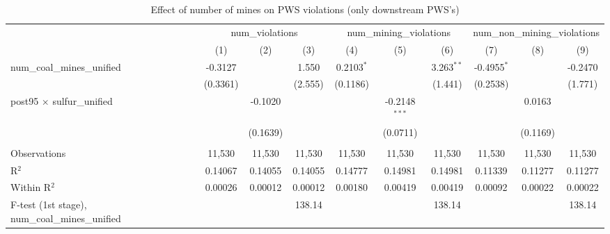 
\begin{table}[htbp]
   \caption{\label{olsrf2sls_nummine_count_vio_1985to2005dwnstrm_coalunified} Effect of number of mines on PWS violations (only downstream PWS's)}
   \bigskip
   \centering
   \begin{adjustbox}{width = \textwidth, center}
      \begin{tabular}{lccccccccc}
         \toprule
          & \multicolumn{3}{c}{num\_violations} & \multicolumn{3}{c}{num\_mining\_violations} & \multicolumn{3}{c}{num\_non\_mining\_violations}\\
                                                          & (1)           & (2)           & (3)           & (4)           & (5)             & (6)           & (7)           & (8)           & (9)\\  
         \midrule 
         num\_coal\_mines\_unified                        & -0.3127       &               & 1.550         & 0.2103$^{*}$  &                 & 3.263$^{**}$  & -0.4955$^{*}$ &               & -0.2470\\   
                                                          & (0.3361)      &               & (2.555)       & (0.1186)      &                 & (1.441)       & (0.2538)      &               & (1.771)\\   
         post95 $\times$ sulfur\_unified                  &               & -0.1020       &               &               & -0.2148$^{***}$ &               &               & 0.0163        &   \\   
                                                          &               & (0.1639)      &               &               & (0.0711)        &               &               & (0.1169)      &   \\   
          \\
         Observations                                     & 11,530        & 11,530        & 11,530        & 11,530        & 11,530          & 11,530        & 11,530        & 11,530        & 11,530\\  
         R$^2$                                            & 0.14067       & 0.14055       & 0.14055       & 0.14777       & 0.14981         & 0.14981       & 0.11339       & 0.11277       & 0.11277\\  
         Within R$^2$                                     & 0.00026       & 0.00012       & 0.00012       & 0.00180       & 0.00419         & 0.00419       & 0.00092       & 0.00022       & 0.00022\\  
         F-test (1st stage), num\_coal\_mines\_unified    &               &               & 138.14        &               &                 & 138.14        &               &               & 138.14\\  

\end{tabular}
\end{adjustbox}
\end{table}
